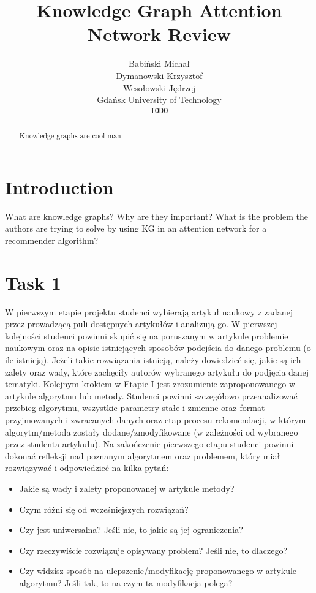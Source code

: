\documentclass{article}
\title{Knowledge Graph Attention Network Review}
\author{Babiński Michał \\
        Dymanowski Krzysztof \\
        Wesołowski Jędrzej \\
        Gdańsk University of Technology \\
        \texttt{TODO}}
\begin{document}
\maketitle

\begin{abstract}
Knowledge graphs are cool man.
\end{abstract}

\section{Introduction}
What are knowledge graphs? Why are they important? What is the problem the authors are trying to solve by using KG in an attention network for a recommender algorithm?

\section{Task 1}
W pierwszym etapie projektu studenci wybierają artykuł naukowy
z zadanej przez prowadzącą puli dostępnych artykułów i analizują go.
W pierwszej kolejności studenci powinni skupić się na poruszanym w artykule
problemie naukowym oraz na opisie istniejących sposobów podejścia do
danego problemu (o ile istnieją). Jeżeli takie rozwiązania istnieją, należy
dowiedzieć się, jakie są ich zalety oraz wady, które zachęciły autorów
wybranego artykułu do podjęcia danej tematyki.
Kolejnym krokiem w Etapie I jest zrozumienie zaproponowanego
w artykule algorytmu lub metody. Studenci powinni szczegółowo przeanalizować
przebieg algorytmu, wszystkie parametry stałe i zmienne oraz format
przyjmowanych i zwracanych danych oraz etap procesu rekomendacji, w którym
algorytm/metoda zostały dodane/zmodyfikowane (w zależności od wybranego
przez studenta artykułu).
Na zakończenie pierwszego etapu studenci powinni dokonać refleksji nad
poznanym algorytmem oraz problemem, który miał rozwiązywać i odpowiedzieć
na kilka pytań:
\begin{itemize}
    \item Jakie są wady i zalety proponowanej w artykule metody?
    \item Czym różni się od wcześniejszych rozwiązań?
    \item Czy jest uniwersalna? Jeśli nie, to jakie są jej ograniczenia?
    \item Czy rzeczywiście rozwiązuje opisywany problem? Jeśli nie, to dlaczego?
    \item Czy widzisz sposób na ulepszenie/modyfikację proponowanego w artykule algorytmu? Jeśli tak, to na czym ta modyfikacja polega?
\end{itemize}
\end{document}

